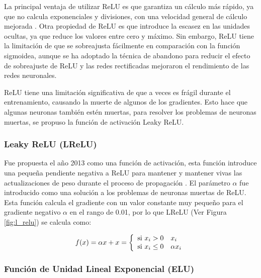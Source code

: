 \vspace{5mm} %

La principal ventaja de utilizar ReLU es que garantiza un cálculo más rápido, ya que no calcula exponenciales y divisiones, con una velocidad general de cálculo mejorada \cite{45}. Otra propiedad de ReLU es que introduce la escasez en las unidades ocultas, ya que reduce los valores entre cero y máximo. Sin embargo, ReLU tiene la limitación de que se sobreajusta fácilmente en comparación con la función sigmoidea, aunque se ha adoptado la técnica de abandono para reducir el efecto de sobreajuste de ReLU y las redes rectificadas mejoraron el rendimiento de las redes neuronales.

\vspace{5mm} %

ReLU tiene una limitación significativa de que a veces es frágil durante el entrenamiento, causando la muerte de algunos de los gradientes. Esto hace que algunas neuronas también estén muertas, para resolver los problemas de neuronas muertas, se propuso la funci\'{o}n de activaci\'{o}n Leaky ReLU.

\subsubsection{Leaky ReLU (LReLU)}

Fue propuesta el a\~{n}o 2013 como una funci\'{o}n de activaci\'{o}n, esta funci\'{o}n introduce una peque\~{n}a pendiente negativa a ReLU para mantener y mantener vivas las actualizaciones de peso durante el proceso de propagaci\'{o}n \cite{44}. El par\'{a}metro $\alpha$ fue introducido como una soluci\'{o}n a los problemas de neuronas muertas de ReLU. Esta funci\'{o}n calcula el gradiente con un valor constante muy peque\~{n}o para el gradiente negativo $\alpha$ en el rango de 0.01, por lo que LReLU (Ver Figura \ref{fig:l_relu}) se calcula como:

\begin{equation}
f(x) = \alpha x + x = \left\lbrace
\begin{array}{ll}
\textup{si } x_{i}>0 & x_{i}\\
\textup{si } x_{i} \leq 0 & \alpha x_{i}
\end{array}
\right.
\end{equation}

\subsubsection{Funci\'{o}n de Unidad Lineal Exponencial (ELU)}

